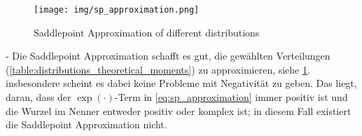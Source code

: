 \begin{figure}[h]
    \centering
    \texttt{[image: img/sp\_approximation.png]}
    \caption{Saddlepoint Approximation of different distributions}
    \label{fig:sp_approximation}
\end{figure}

- Die Saddlepoint Approximation schafft es gut, die gewählten Verteilungen (\ref{table:distributions_theoretical_moments}) zu approximieren, siehe \ref{fig:sp_approximation}. insbesondere scheint es dabei keine Probleme mit Negativität zu geben. Das liegt, daran, dass der $\exp(\cdot)$-Term in \eqref{eq:sp_approximation} immer positiv ist und die Wurzel im Nenner entweder positiv oder komplex ist; in diesem Fall existiert die Saddlepoint Approximation nicht.